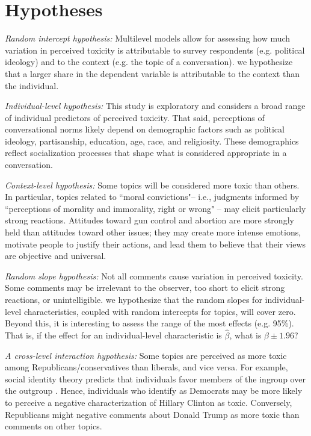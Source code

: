 \documentclass{article}
\begin{document}
\section{Hypotheses}

\textit{Random intercept hypothesis:} Multilevel models allow for assessing how much variation in perceived toxicity is attributable to survey respondents (e.g. political ideology) and to the context (e.g. the topic of a conversation). we hypothesize that a larger share in the dependent variable is attributable to the context than the individual.

\textit{Individual-level hypothesis:} This study is exploratory and considers a broad range of individual predictors of perceived toxicity. That said, perceptions of conversational norms likely depend on demographic factors such as political ideology, partisanship, education, age, race, and religiosity. These demographics reflect socialization processes that shape what is considered appropriate in a conversation. 

\textit{Context-level hypothesis:} Some topics will be considered more toxic than others. In particular, topics related to ``moral convictions"-- i.e., judgments informed by ``perceptions of morality and immorality, right or wrong" \citep{skitka_conviction_2010} -- may elicit particularly strong reactions. Attitudes toward gun control and abortion are more strongly held than attitudes toward other issues; they may create more intense emotions, motivate people to justify their actions, and lead them to believe that their views are objective and universal. 

\textit{Random slope hypothesis:} Not all comments cause variation in perceived toxicity. Some comments may be irrelevant to the observer, too short to elicit strong reactions, or unintelligible. we hypothesize that the random slopes for individual-level characteristics, coupled with random intercepts for topics, will cover zero. Beyond this, it is interesting to assess the range of the most effects (e.g. 95\%). That is, if the effect for an individual-level characteristic is $\hat \beta$, what is $\beta\pm 1.96$?

\textit{A cross-level interaction hypothesis:} Some topics are perceived as more toxic among Republicans/conservatives than liberals, and vice versa. For example, social identity theory predicts that individuals favor members of the ingroup over the outgroup \citep{tafjelturner_identity_2004}. Hence, individuals who identify as Democrats may be more likely to perceive a negative characterization of Hillary Clinton as toxic. Conversely, Republicans might negative comments about Donald Trump as more toxic than comments on other topics.
\end{document}
